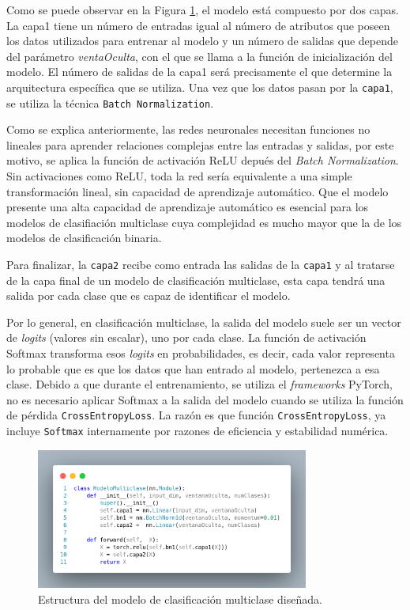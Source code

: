 Como se puede observar en la Figura \ref{fig:modMUL}, el modelo está compuesto por dos capas. La capa1 tiene un número de entradas igual al número de atributos que poseen los datos utilizados para entrenar al modelo y un número de salidas que depende del parámetro \textit{ventaOculta}, con el que se llama a la función de inicialización del modelo. El número de salidas de la capa1 será precisamente el que determine la arquitectura específica que se utiliza. Una vez que los datos pasan por la \texttt{capa1}, se utiliza la técnica \texttt{Batch Normalization}. 

Como se explica anteriormente, las redes neuronales necesitan funciones no lineales para aprender relaciones complejas entre las entradas y salidas, por este motivo, se aplica la función de activación ReLU depués del \textit{Batch Normalization}. Sin activaciones como ReLU, toda la red sería equivalente a una simple transformación lineal, sin capacidad de aprendizaje automático. Que el modelo presente una alta capacidad de aprendizaje automático es esencial para los modelos de clasifiación multiclase cuya complejidad es mucho mayor que la de los modelos de clasificación binaria.

Para finalizar, la \texttt{capa2} recibe como entrada las salidas de la \texttt{capa1} y al tratarse de la capa final de un modelo de clasificación multiclase, esta capa tendrá una salida por cada clase que es capaz de identificar el modelo.

Por lo general, en clasificación multiclase, la salida del modelo suele ser un vector de \textit{logits} (valores sin escalar), uno por cada clase. La función de activación Softmax transforma esos \textit{logits} en probabilidades, es decir, cada valor representa lo probable que es que los datos que han entrado al modelo, pertenezca a esa clase. Debido a que durante el entrenamiento, se utiliza el \textit{frameworks} PyTorch, no es necesario aplicar Softmax a la salida del modelo cuando se utiliza la función de pérdida \texttt{CrossEntropyLoss}. La razón es que función \texttt{CrossEntropyLoss}, ya incluye \texttt{Softmax} internamente por razones de eficiencia y estabilidad numérica.

\begin{figure}[H]
    \centering
    \includegraphics[width=0.8\textwidth]{./img/modelo/codigo/modeloMUL.png}
    \caption{Estructura del modelo de clasificación multiclase diseñada.}
    \label{fig:modMUL}
\end{figure}

